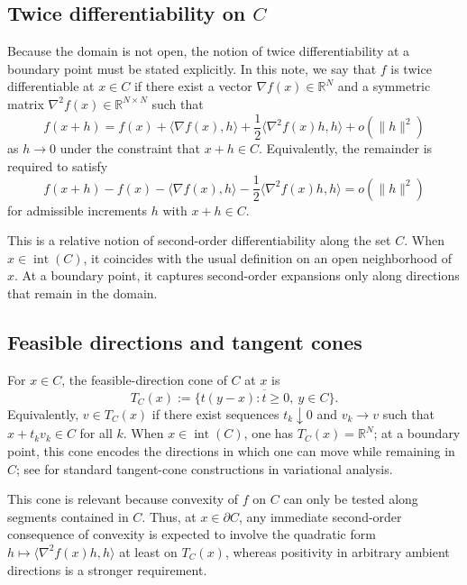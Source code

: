 \documentclass[reqno]{amsart}
\theoremstyle{definition}
\newcommand{\R}{\mathbb{R}}
\newcommand{\inner}[2]{\langle #1,#2\rangle}
\begin{document}
\subsection{Twice differentiability on \texorpdfstring{$C$}{C}}

Because the domain is not open, the notion of twice differentiability at a
boundary point must be stated explicitly. In this note, we say that $f$ is
twice differentiable at $x \in C$ if there exist a vector $\nabla f(x) \in \R^N$
and a symmetric matrix $\nabla^2 f(x) \in \R^{N \times N}$ such that
\begin{equation}
    f(x+h)=f(x)+\inner{\nabla f(x)}{h}+\dfrac12 \inner{\nabla^2 f(x)h}{h}+o(\|h\|^2)
\end{equation}
as $h \to 0$ under the constraint that $x+h \in C$. Equivalently, the remainder
is required to satisfy
\begin{equation}
    f(x+h)-f(x)-\inner{\nabla f(x)}{h}-\dfrac12 \inner{\nabla^2 f(x)h}{h}=o(\|h\|^2)
\end{equation}
for admissible increments $h$ with $x+h \in C$.

This is a relative notion of second-order differentiability along the set $C$.
When $x \in \operatorname{int}(C)$, it coincides with the usual definition on an
open neighborhood of $x$. At a boundary point, it captures second-order
expansions only along directions that remain in the domain.

\subsection{Feasible directions and tangent cones}

For $x \in C$, the feasible-direction cone of $C$ at $x$ is
\begin{equation}
    T_C(x):=\overline{\{t(y-x): t \geq 0,\ y \in C\}}.
\end{equation}
Equivalently, $v \in T_C(x)$ if there exist sequences $t_k \downarrow 0$ and
$v_k \to v$ such that $x+t_k v_k \in C$ for all $k$. When $x \in
\operatorname{int}(C)$, one has $T_C(x)=\R^N$; at a boundary point, this cone
encodes the directions in which one can move while remaining in $C$; see
\citet{RockafellarWets1998} for standard tangent-cone constructions in
variational analysis.

This cone is relevant because convexity of $f$ on $C$ can only be tested along
segments contained in $C$. Thus, at $x \in \partial C$, any immediate
second-order consequence of convexity is expected to involve the quadratic form
$h \mapsto \inner{\nabla^2 f(x)h}{h}$ at least on $T_C(x)$, whereas positivity in
arbitrary ambient directions is a stronger requirement.
\end{document}
